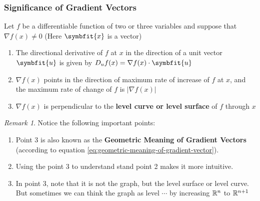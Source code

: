 \documentclass[math,code]{amznotes}
\theoremstyle{remark}
\newtheorem*{remark}{Remark}
\begin{document}
\subsubsection{Significance of Gradient Vectors}
Let $f$ be a differentiable function of two or three variables and suppose that $\nabla f(x) \neq 0$ (Here $\symbfit{x}$ is a vector)
\begin{enumerate}
    \item The directional derivative of $f$ at $x$ in the direction of a unit vector $\symbfit{u}$ is given by $D_uf(x)=\nabla f(x) \cdot \symbfit{u}$
    \item $\nabla f(x)$ points in the direction of maximum rate of increase of $f$ at $x$, and the maximum rate of change of $f$ is $|\nabla f(x)|$
    \item $\nabla f(x)$ is perpendicular to the {\color{red} \textbf{level curve or level surface}} of $f$ through $x$ \label{}
\end{enumerate}
\begin{notebox}
    \begin{remark}
    Notice the following important points:
        \begin{enumerate}
            \item Point 3 is also known as the {\color{red} \textbf{Geometric Meaning of Gradient Vectors}} (according to equation \eqref{eq:geometric-meaning-of-gradient-vector}).
            \item Using the point 3 to understand stand point 2 makes it more intuitive.
            \item In point 3, note that it is not the graph, but the level surface or level curve. But sometimes we can think the graph as level $\cdots$ by increasing $\mathbb{R}^n$ to $\mathbb{R}^{n+1}$
        \end{enumerate}
    \end{remark}
\end{notebox}
\end{document}
